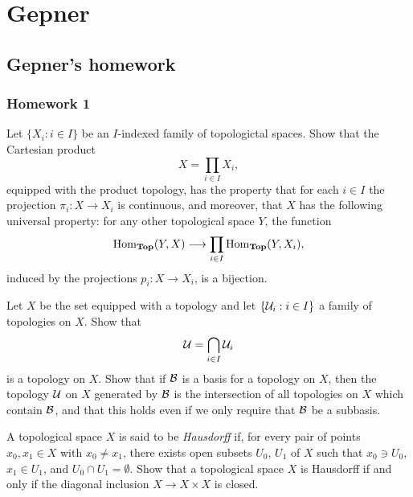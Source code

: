 \chapter{Gepner}
\section{Gepner's homework}
\subsection{Homework 1}
\begin{exercise}
  Let \(\{X_i:i\in I\}\) be an \(I\)-indexed family of topologictal
  spaces. Show that the Cartesian product
  \[
    X=\prod_{i\in I} X_i,
  \]
  equipped with the product topology, has the property that for each
  \(i\in I\) the projection \(\pi_i\colon X\to X_i\) is continuous, and
  moreover, that \(X\) has the following universal property: for any other
  topological space \(Y\), the function
  \[
    \operatorname{Hom}_{\mathbf{Top}}(Y,X)\longrightarrow\prod_{i\in I}\operatorname{Hom}_{\mathbf{Top}}(Y,X_i),
  \]
  induced by the projections \(p_i\colon X\to X_i\), is a bijection.
\end{exercise}
\begin{solution}
\end{solution}

\begin{exercise}
  Let \(X\) be the set equipped with a topology and let
  \(\{\mathcal{U}_i:i\in I\}\) a family of topologies on \(X\). Show that
  \[
    \mathcal{U}=\bigcap_{i\in I}\mathcal{U}_i
  \]
  is a topology on \(X\). Show that if \(\mathcal{B}\) is a basis for a topology
  on \(X\), then the topology \(\mathcal{U}\) on \(X\) generated by \(\mathcal{B}\) is
  the intersection of all topologies on \(X\) which contain \(\mathcal{B}\), and
  that this holds even if we only require that \(\mathcal{B}\) be a subbasis.
\end{exercise}
\begin{solution}
\end{solution}

\begin{exercise}
  A topological space \(X\) is said to be \emph{Hausdorff} if, for every
  pair of points \(x_0,x_1\in X\) with \(x_0\neq x_1\), there exists open
  subsets \(U_0\), \(U_1\) of \(X\) such that \(x_0\ni U_0\),
  \(x_1\in U_1\), and \(U_0\cap U_1=\emptyset\). Show that a topological
  space \(X\) is Hausdorff if and only if the diagonal inclusion
  \(X\to X\times X\) is closed.
\end{exercise}
\begin{solution}
\end{solution}

